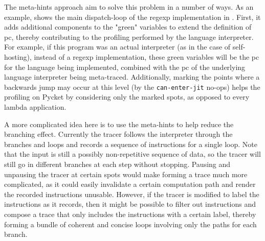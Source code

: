 The meta-hints approach aim to solve this problem in a number of
ways. As an example,  shows the main
dispatch-loop of the regexp implementation in
. First, it adds additional components to the
"green" variables to extend the definition of pc, thereby contributing
to the profiling performed by the language interpreter. For example,
if this program was an actual interpreter (as in the case of
self-hosting), instead of a regexp implementation, these green
variables will be the pc for the language being implemented, combined
with the pc of the underlying language interpreter being
meta-traced. Additionally, marking the points where a backwards jump
may occur at this level (by the \verb|can-enter-jit| no-ops) helps the
profiling on Pycket by considering only the marked spots, as opposed
to every lambda application.

A more complicated idea here is to use the meta-hints to help reduce
the branching effect. Currently the tracer follows the interpreter
through the branches and loops and records a sequence of instructions
for a single loop. Note that the input is still a possibly
non-repetitive sequence of data, so the tracer will still go in
different branches at each step without stopping. Pausing and
unpausing the tracer at certain spots would make forming a trace much
more complicated, as it could easily invalidate a certain computation
path and render the recorded instructions unusable. However, if the
tracer is modified to label the instructions as it records, then it
might be possible to filter out instructions and compose a trace that
only includes the instructions with a certain label, thereby forming a
bundle of coherent and concise loops involving only the paths for each
branch.

